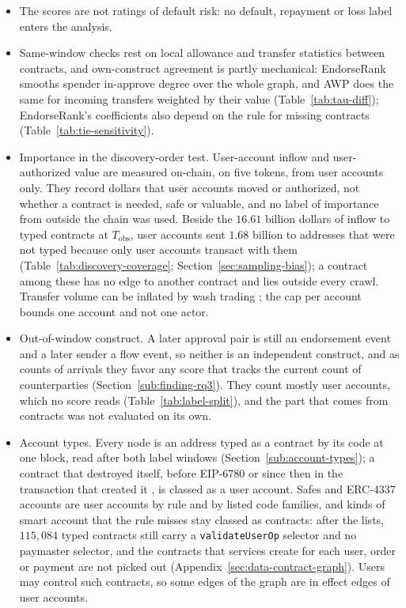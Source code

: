 \begin{itemize}
\item The scores are not ratings of default risk: no default, repayment or loss label enters the analysis.
\item Same-window checks rest on local allowance and transfer statistics between contracts, and own-construct agreement is partly mechanical: EndorseRank smooths spender in-approve degree over the whole graph, and AWP does the same for incoming transfers weighted by their value (Table~\ref{tab:tau-diff}); EndorseRank's coefficients also depend on the rule for missing contracts (Table~\ref{tab:tie-sensitivity}).
\item Importance in the discovery-order test. User-account inflow and user-authorized value are measured on-chain, on five tokens, from user accounts only. They record dollars that user accounts moved or authorized, not whether a contract is needed, safe or valuable, and no label of importance from outside the chain was used. Beside the $16.61$ billion dollars of inflow to typed contracts at $T_{\mathrm{obs}}$, user accounts sent $1.68$ billion to addresses that were not typed because only user accounts transact with them (Table~\ref{tab:discovery-coverage}; Section~\ref{sec:sampling-bias}); a contract among these has no edge to another contract and lies outside every crawl. Transfer volume can be inflated by wash trading \parencite{victor2021washtrading}; the cap per account bounds one account and not one actor.
\item Out-of-window construct. A later approval pair is still an endorsement event and a later sender a flow event, so neither is an independent construct, and as counts of arrivals they favor any score that tracks the current count of counterparties (Section~\ref{sub:finding-rq3}). They count mostly user accounts, which no score reads (Table~\ref{tab:label-split}), and the part that comes from contracts was not evaluated on its own.
\item Account types. Every node is an address typed as a contract by its code at one block, read after both label windows (Section~\ref{sub:account-types}); a contract that destroyed itself, before EIP-6780 or since then in the transaction that created it \parencite{ballet2023eip6780}, is classed as a user account. Safes and ERC-4337 accounts are user accounts by rule and by listed code families, and kinds of smart account that the rule misses stay classed as contracts: after the lists, $115{,}084$ typed contracts still carry a \texttt{validateUserOp} selector and no paymaster selector, and the contracts that services create for each user, order or payment are not picked out (Appendix~\ref{sec:data-contract-graph}). Users may control such contracts, so some edges of the graph are in effect edges of user accounts.

\end{itemize}
